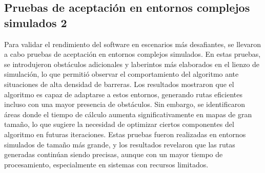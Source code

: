 \subsection{Pruebas de aceptaci\'on en entornos complejos simulados 2}
    Para validar el rendimiento del software en escenarios m\'as
        desafiantes, se llevaron a cabo pruebas de aceptaci\'on en
        entornos complejos simulados. En estas pruebas, se
        introdujeron obst\'aculos adicionales y laberintos m\'as
        elaborados en el lienzo de simulaci\'on, lo que permiti\'o
        observar el comportamiento del algoritmo ante situaciones
        de alta densidad de barreras.
    \vskip 0.5cm
    Los resultados mostraron que el algoritmo es capaz de
        adaptarse a estos entornos, generando rutas eficientes incluso
        con una mayor presencia de obst\'aculos. Sin embargo, se
        identificaron \'areas donde el tiempo de c\'alculo aumenta
        significativamente en mapas de gran tama\~no, lo que sugiere
        la necesidad de optimizar ciertos componentes del algoritmo
        en futuras iteraciones.
    \vskip 0.5cm
    Estas pruebas fueron realizadas en entornos simulados de
        tama\~no m\'as grande, y los resultados revelaron que las rutas
        generadas contin\'uan siendo precisas, aunque con un mayor
        tiempo de procesamiento, especialmente en sistemas con
        recursos limitados.
    \vskip 0.5cm